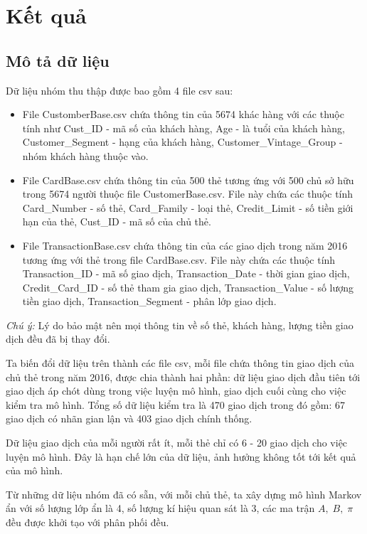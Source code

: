 \setcounter{chapter}{2}
\chapter{Kết quả}
\section{Mô tả dữ liệu}
Dữ liệu nhóm thu thập được bao gồm 4 file csv sau:
\begin{itemize}
	\item File CustomberBase.csv chứa thông tin của 5674 khác hàng với các thuộc tính như Cust\_ID - mã số của khách hàng, Age - là tuổi của khách hàng, Customer\_Segment - hạng của khách hàng, Customer\_Vintage\_Group - nhóm khách hàng thuộc vào.
	\item File CardBase.csv chứa thông tin của 500 thẻ tương ứng với 500 chủ sở hữu trong 5674 người thuộc file CustomerBase.csv. File này chứa các thuộc tính Card\_Number - số thẻ, Card\_Family - loại thẻ, Credit\_Limit - số tiền giới hạn của thẻ, Cust\_ID - mã số của chủ thẻ.
	\item File TransactionBase.csv chứa thông tin của các giao dịch trong năm 2016 tương ứng với thẻ trong file CardBase.csv. File này chứa các thuộc tính Transaction\_ID - mã số giao dịch, Transaction\_Date - thời gian giao dịch, Credit\_Card\_ID - số thẻ tham gia giao dịch, Transaction\_Value - số lượng tiền giao dịch, Transaction\_Segment - phân lớp giao dịch.
\end{itemize}
\textit{Chú ý:} Lý do bảo mật nên mọi thông tin về số thẻ, khách hàng, lượng tiền giao dịch đều đã bị thay đổi.

Ta biến đổi dữ liệu trên thành các file csv, mỗi file chứa thông tin giao dịch của chủ thẻ trong năm 2016, được chia thành hai phần: dữ liệu giao dịch đầu tiên tới giao dịch áp chót dùng trong việc luyện mô hình, giao dịch cuối cùng cho việc kiểm tra mô hình. Tổng số dữ liệu kiểm tra là 470 giao dịch trong đó gồm: 67 giao dịch có nhãn gian lận và 403 giao dịch chính thống.

Dữ liệu giao dịch của mỗi người rất ít, mỗi thẻ chỉ có 6 - 20 giao dịch cho việc luyện mô hình. Đây là hạn chế lớn của dữ liệu, ảnh hưởng không tốt tới kết quả của mô hình.

Từ những dữ liệu nhóm đã có sẵn, với mỗi chủ thẻ, ta xây dựng mô hình Markov ẩn với số lượng lớp ẩn là 4, số lượng kí hiệu quan sát là 3, các ma trận $A,\; B,\; \pi$ đều được khởi tạo với phân phối đều.

